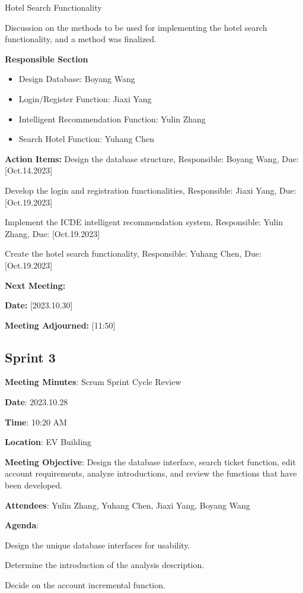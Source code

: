 \documentclass[conference]{IEEEtran}
\begin{document}
Hotel Search Functionality

Discussion on the methods to be used for implementing the hotel search functionality, and a method was finalized.

\textbf{Responsible Section}
\begin{itemize}
\item Design Database: Boyang Wang
\item Login/Register Function: Jiaxi Yang
\item Intelligent Recommendation Function: Yulin Zhang
\item Search Hotel Function: Yuhang Chen
\end{itemize}
\textbf{Action Items:}
Design the database structure, Responsible: Boyang Wang, Due: [Oct.14.2023]

Develop the login and registration functionalities, Responsible: Jiaxi Yang, Due: [Oct.19.2023]

Implement the ICDE intelligent recommendation system, Responsible: Yulin Zhang, Due: [Oct.19.2023]

Create the hotel search functionality, Responsible: Yuhang Chen, Due: [Oct.19.2023]

\textbf{Next Meeting:}

\textbf{Date:} [2023.10.30]

\textbf{Meeting Adjourned:} [11:50]


\subsection*{Sprint 3}

\textbf{Meeting Minutes}: Scrum Sprint Cycle Review

\textbf{Date}: 2023.10.28

\textbf{Time}: 10:20 AM

\textbf{Location}: EV Building

\textbf{Meeting Objective}: Design the database interface, search ticket function, edit account requirements, analyze introductions, and review the functions that have been developed.

\textbf{Attendees}: Yulin Zhang, Yuhang Chen, Jiaxi Yang, Boyang Wang

\textbf{Agenda}:

Design the unique database interfaces for usability.

Determine the introduction of the analysis description.

Decide on the account incremental function.
\end{document}
